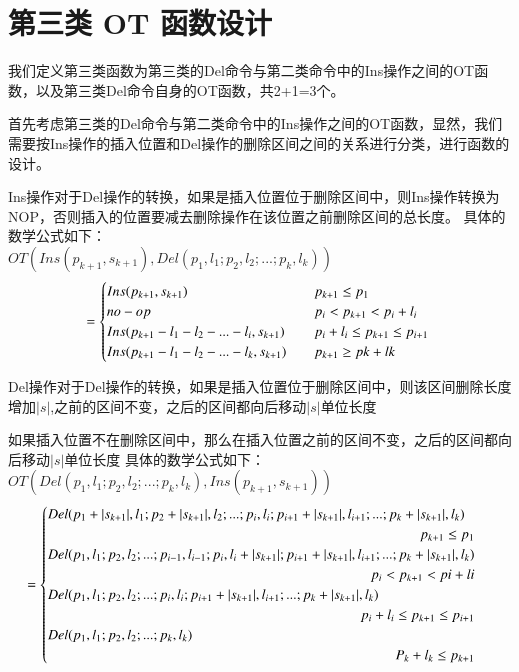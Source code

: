 \section{第三类 OT 函数设计}
\par 我们定义第三类函数为第三类的Del命令与第二类命令中的Ins操作之间的OT函数，以及第三类Del命令自身的OT函数，共2+1=3个。
\par 首先考虑第三类的Del命令与第二类命令中的Ins操作之间的OT函数，显然，我们需要按Ins操作的插入位置和Del操作的删除区间之间的关系进行分类，进行函数的设计。
\par Ins操作对于Del操作的转换，如果是插入位置位于删除区间中，则Ins操作转换为NOP，否则插入的位置要减去删除操作在该位置之前删除区间的总长度。
具体的数学公式如下：\\
$OT(Ins(p_{k+1},s_{k+1}),Del(p_1,l_1;p_2,l_2;...;p_k,l_k))$\\
\begin{equation}
= \begin{cases}
Ins(p_{k+1},s_{k+1}) \quad & p_{k+1} \le p_1 \\
no-op \quad & p_i<p_{k+1}<p_i+l_i\\
Ins(p_{k+1}-l_1-l_2-...-l_i,s_{k+1}) \quad & p_i+l_i \le p_{k+1} \le p_{i+1}\\
Ins(p_{k+1}-l_1-l_2-...-l_k,s_{k+1}) \quad & p_{k+1} \ge pk+lk \end{cases}\\
\end{equation}

\par Del操作对于Del操作的转换，如果是插入位置位于删除区间中，则该区间删除长度增加$|s|$,之前的区间不变，之后的区间都向后移动$|s|$单位长度
\par 如果插入位置不在删除区间中，那么在插入位置之前的区间不变，之后的区间都向后移动$|s|$单位长度
具体的数学公式如下：\\
$OT(Del(p_1,l_1;p_2,l_2;...;p_k,l_k),Ins(p_{k+1},s_{k+1}))$\\
\begin{equation}
= \begin{cases}
Del(p_1+|s_{k+1}|,l_1;p_2+|s_{k+1}|,l_2;...;p_i,l_i;p_{i+1}+|s_{k+1}|,l_{i+1};...;p_k+|s_{k+1}|,l_k)\\
  \quad \hfill p_{k+1} \le p_1 \\
Del(p_1,l_1;p_2,l_2;...;p_{i-1},l_{i-1};p_i,l_i+|s_{k+1}|;p_{i+1}+|s_{k+1}|,l_{i+1};...;p_k+|s_{k+1}|,l_k)\\
 \quad \hfill p_i<p_{k+1} < pi+li \\
Del(p_1,l_1;p_2,l_2;...;p_i,l_i;p_{i+1}+|s_{k+1}|,l_{i+1};...;p_k+|s_{k+1}|,l_k)\\
  \quad \hfill p_i+l_i \le p_{k+1} \le p_{i+1}\\
Del(p_1,l_1;p_2,l_2;...;p_k,l_k) \\
 \quad \hfill P_k+l_k \le p_{k+1} \\
 \end{cases}\\
\end{equation}

